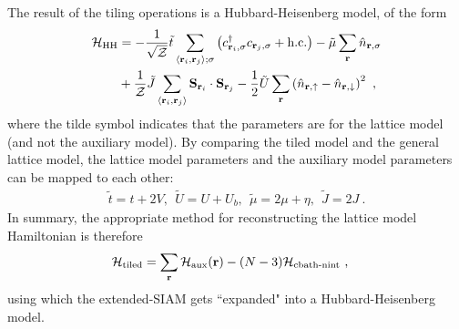 \documentclass[reprint,hidelinks]{revtex4-2}
\begin{document}
The result of the tiling operations is a Hubbard-Heisenberg model, of the form
\begin{equation}\begin{aligned}
	\mathcal{H}_\text{HH} &= -\frac{1}{\sqrt\mathcal{Z}}\tilde t\sum_{\left<{\bf r}_i, {\bf r}_j\right>;\sigma}\left(c^\dagger_{{\bf r}_i,\sigma}c_{{\bf r}_j,\sigma} + \text{h.c.}\right) - \tilde \mu \sum_{{\bf r}}\hat n_{{\bf r},\sigma}\\
						  &+ \frac{1}{\mathcal{Z}}\tilde J\sum_{\left< {\bf r}_i, {\bf r}_j\right>}{\bf S}_{{\bf r}_i}\cdot{\bf S}_{{\bf r}_j} - \frac{1}{2}\tilde U\sum_{\bf r}\left(\hat n_{{\bf r} , \uparrow} - \hat n_{{\bf r} , \downarrow}\right)^2  ~,
\end{aligned}\end{equation}
where the tilde symbol indicates that the parameters are for the lattice model (and not the auxiliary model). By comparing the tiled model and the general lattice model, the lattice model parameters and the auxiliary model parameters can be mapped to each other:
\begin{equation}\begin{aligned}\label{couplingsMappings}
	\tilde t = t+2V,~~ \tilde U = U + U_b, ~ ~ \tilde \mu = 2\mu + \eta,~ ~ \tilde J = 2J~.
\end{aligned}\end{equation}
In summary, the appropriate method for reconstructing the lattice model Hamiltonian is therefore
\begin{equation}\begin{aligned}\label{tilingPrescriptionFinal}
	\mathcal{H}_\text{tiled} &= \sum_{{\bf r}}\mathcal{H}_\text{aux}({\bf r}) - (N-3)\mathcal{H}_\text{cbath-nint}~,
\end{aligned}\end{equation}
using which the extended-SIAM gets ``expanded" into a Hubbard-Heisenberg model.
\end{document}
